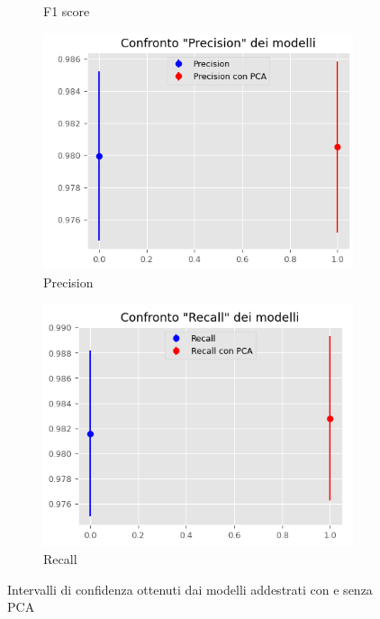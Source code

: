 \begin{figure}[!ht]
\begin{subfigure}[b]{0.4\textwidth}
        \caption{F1 score}
        \label{fig:f1}
    \end{subfigure}
    \hfill
    \begin{subfigure}[b]{0.4\textwidth}
        \centering
        \includegraphics[width=\textwidth]{img/rete/intervalliPrecision.png}
        \caption{Precision}
        \label{fig:precision}
    \end{subfigure}
    \hfill
    \begin{subfigure}[b]{0.4\textwidth}
        \centering
        \includegraphics[width=\textwidth]{img/rete/intervalliRecall.png}
        \caption{Recall}
        \label{fig:recall}
    \end{subfigure}
    \caption{Intervalli di confidenza ottenuti dai modelli addestrati con e senza PCA}
    \label{fig:intervalli_confidenza_corr}
\end{figure}

